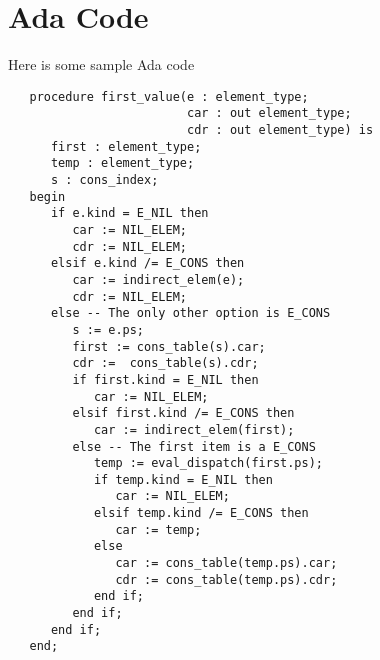 \documentclass[10pt, openany]{book}
\begin{document}
\section{Ada Code}
Here is some sample Ada code
\lstset{language=Ada}
\begin{lstlisting}
   procedure first_value(e : element_type;
                         car : out element_type;
                         cdr : out element_type) is
      first : element_type;
      temp : element_type;
      s : cons_index;
   begin
      if e.kind = E_NIL then
         car := NIL_ELEM;
         cdr := NIL_ELEM;
      elsif e.kind /= E_CONS then
         car := indirect_elem(e);
         cdr := NIL_ELEM;
      else -- The only other option is E_CONS
         s := e.ps;
         first := cons_table(s).car;
         cdr :=  cons_table(s).cdr;
         if first.kind = E_NIL then
            car := NIL_ELEM;
         elsif first.kind /= E_CONS then
            car := indirect_elem(first);
         else -- The first item is a E_CONS
            temp := eval_dispatch(first.ps);
            if temp.kind = E_NIL then
               car := NIL_ELEM;
            elsif temp.kind /= E_CONS then
               car := temp;
            else
               car := cons_table(temp.ps).car;
               cdr := cons_table(temp.ps).cdr;
            end if;
         end if;
      end if;
   end;

\end{lstlisting}
\end{document}

